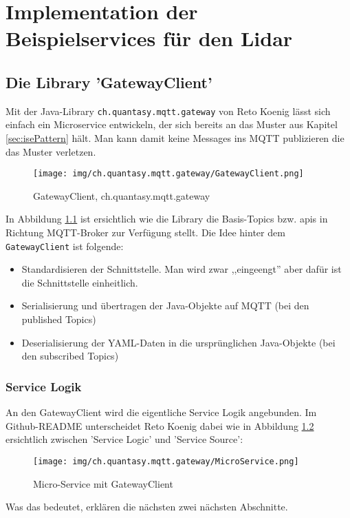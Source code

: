 \chapter{Implementation der Beispielservices für den Lidar}
\label{chap:beispielimplementation}
\section{Die Library 'GatewayClient'}
Mit der  Java-Library \verb|ch.quantasy.mqtt.gateway| von Reto Koenig\cite{ch.quantasy.mqtt.gateway} lässt sich einfach ein Microservice entwickeln, der sich bereits an das Muster aus Kapitel \ref{sec:isePattern} hält. Man kann damit keine Messages ins MQTT publizieren die das Muster verletzen. 
\begin{figure}[H]
	\centering
	\texttt{[image: img/ch.quantasy.mqtt.gateway/GatewayClient.png]}
	\caption{GatewayClient, ch.quantasy.mqtt.gateway\cite{ch.quantasy.mqtt.gateway}}
	\label{fig:gatewayclient}
\end{figure}
In Abbildung \ref{fig:gatewayclient} ist ersichtlich wie die Library die Basis-Topics bzw. \acrshort{api}s in Richtung MQTT-Broker zur Verfügung stellt. Die Idee hinter dem \verb|GatewayClient| ist folgende:
\begin{itemize}
	\item
	Standardisieren der Schnittstelle. Man wird zwar ,,eingeengt'' aber dafür ist die Schnittstelle einheitlich.
	\item
	Serialisierung und übertragen der Java-Objekte auf MQTT (bei den published Topics)
	\item
	Deserialisierung der YAML-Daten in die ursprünglichen Java-Objekte (bei den subscribed Topics)
\end{itemize}
\subsection{Service Logik}
An den GatewayClient wird die eigentliche Service Logik angebunden. Im Github-README unterscheidet Reto Koenig\cite{ch.quantasy.mqtt.gateway} dabei wie in Abbildung \ref{fig:microService} ersichtlich zwischen 'Service Logic' und 'Service Source':
\begin{figure}[H]
	\centering
	\texttt{[image: img/ch.quantasy.mqtt.gateway/MicroService.png]}
	\caption{Micro-Service mit GatewayClient \cite{ch.quantasy.mqtt.gateway}}
	\label{fig:microService}
\end{figure}
Was das bedeutet, erklären die nächsten zwei nächsten Abschnitte.
